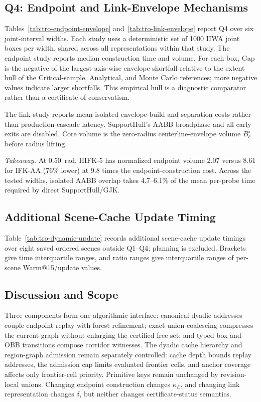 \documentclass[journal]{IEEEtran}
\begin{document}
\subsection{Q4: Endpoint and Link-Envelope Mechanisms}
\label{sec:exp_mechanisms}

Tables~\ref{tab:tro-endpoint-envelope} and~\ref{tab:tro-link-envelope} report Q4
over six joint-interval widths. Each study uses a deterministic set of 1000 IIWA
joint boxes per width, shared across all representations within that study. The
endpoint study reports median construction time and volume. For each box, Gap
is the negative of the largest axis-wise envelope shortfall relative to the
extent hull of the Critical-sample, Analytical, and Monte Carlo references;
more negative values indicate larger shortfalls. This empirical hull is a
diagnostic comparator rather than a certificate of conservatism.

The link study reports mean isolated envelope-build and separation costs rather
than production-cascade latency. SupportHull's AABB broadphase and all early
exits are disabled. Core volume is the zero-radius centerline-envelope volume
$B_\ell^\circ$ before radius lifting.

\noindent\emph{Takeaway.}
At 0.50~rad, HIFK-5 has normalized endpoint volume
2.07 versus 8.61 for IFK-AA (76\% lower) at 9.8 times the endpoint-construction
cost. Across the tested widths, isolated AABB overlap takes 4.7--6.1\% of the
mean per-probe time required by direct SupportHull/GJK\@.

\subsection{Additional Scene-Cache Update Timing}
\label{sec:exp_dynamic_updates}

Table~\ref{tab:tro-dynamic-update} records additional scene-cache update
timings over eight saved ordered scenes outside Q1--Q4; planning is excluded.
Brackets give time interquartile ranges, and ratio ranges give interquartile
ranges of per-scene Warm@15/update values.

\subsection{Discussion and Scope}

Three components form one algorithmic interface: canonical dyadic addresses
couple endpoint replay with forest refinement; exact-union coalescing compresses
the current graph without enlarging the certified free set; and typed box and OBB
transitions compose corridor witnesses. The dyadic cache hierarchy and
region-graph admission remain separately controlled: cache depth bounds replay
addresses, the admission cap limits evaluated frontier cells, and anchor
coverage affects only frontier-cell priority. Primitive keys remain unchanged by
revision-local unions. Changing endpoint
construction changes $\kappa_E$, and changing link representation changes
$\delta$, but neither changes certificate-status semantics.
\end{document}
